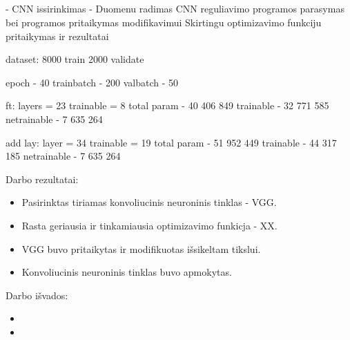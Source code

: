\documentclass{VUMIFPSkursinis}
\begin{document}
\subsection{}


- CNN issirinkimas
- Duomenu radimas
CNN reguliavimo programos parasymas
bei programos pritaikymas modifikavimui
Skirtingu optimizavimo funkciju pritaikymas ir rezultatai


dataset:
8000 train
2000 validate

epoch - 40
trainbatch - 200
valbatch - 50

ft:
layers = 23
trainable = 8
total param - 40 406 849
trainable - 32 771 585
netrainable - 7 635 264

add lay:
layer = 34 
trainable = 19
total param - 51 952 449
trainable - 44 317 185
netrainable - 7 635 264

Darbo rezultatai:
\begin{itemize}
\item Pasirinktas tiriamas konvoliucinis neuroninis tinklas - VGG.
\item Rasta geriausia ir tinkamiausia optimizavimo funkicja - XX.
\item VGG buvo pritaikytas ir modifikuotas išsikeltam tikslui.
\item Konvoliucinis neuroninis tinklas buvo apmokytas.
\end{itemize}


Darbo išvados:
\begin{itemize}
\item 
\item
\end{itemize}

\printbibliography[heading=bibintoc] 
\end{document}
